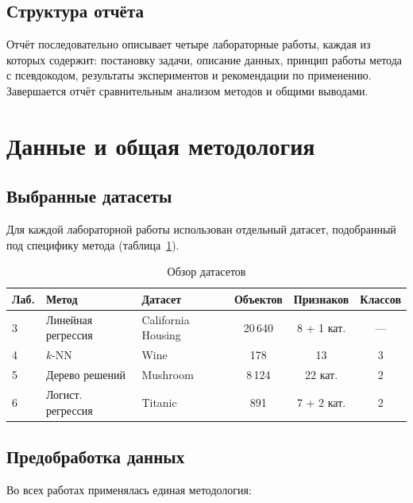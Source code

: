 \documentclass[12pt,a4paper]{article}
\begin{document}
\subsection{Структура отчёта}

Отчёт последовательно описывает четыре лабораторные работы, каждая
из которых содержит: постановку задачи, описание данных, принцип
работы метода с псевдокодом, результаты экспериментов и рекомендации
по применению. Завершается отчёт сравнительным анализом методов
и общими выводами.

\newpage

\section{Данные и общая методология}

\subsection{Выбранные датасеты}

Для каждой лабораторной работы использован отдельный датасет,
подобранный под специфику метода (таблица~\ref{tab:datasets}).

\begin{table}[H]\centering\small
\caption{Обзор датасетов}\label{tab:datasets}
\begin{tabular}{llp{3.5cm}ccc}\toprule
Лаб. & Метод & Датасет & Объектов & Признаков & Классов \\ \midrule
3 & Линейная регрессия & California Housing & 20\,640 & 8 + 1 кат. & — \\
4 & \(k\)-NN & Wine & 178 & 13 & 3 \\
5 & Дерево решений & Mushroom & 8\,124 & 22 кат. & 2 \\
6 & Логист. регрессия & Titanic & 891 & 7 + 2 кат. & 2 \\ \bottomrule
\end{tabular}
\end{table}

\subsection{Предобработка данных}

Во всех работах применялась единая методология:
\end{document}
